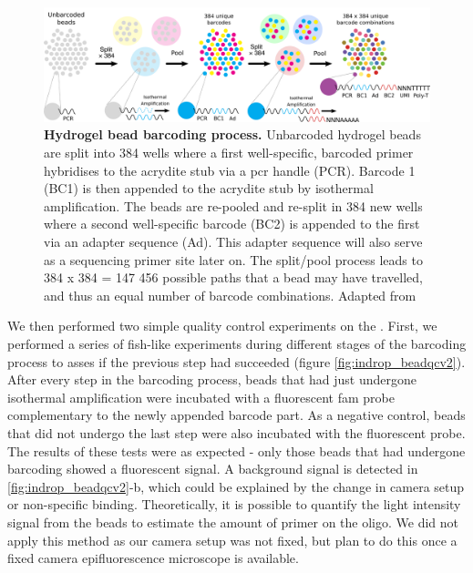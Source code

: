 \begin{figure}[ht]
\centerfloat
\includegraphics[width=\textwidth]{./ims/indrop_splitpoolv2.png}
\caption[Hydrogel bead barcoding process]{\textbf{Hydrogel bead barcoding process.} Unbarcoded hydrogel beads are split into 384 wells where a first well-specific, barcoded primer hybridises to the acrydite stub via a \acrshort{pcr} handle (PCR). Barcode 1 (BC1) is then appended to the acrydite stub by isothermal amplification. The beads are re-pooled and re-split in 384 new wells where a second well-specific barcode (BC2) is appended to the first via an adapter sequence (Ad). This adapter sequence will also serve as a sequencing primer site later on. The split/pool process leads to 384 x 384 = 147 456 possible paths that a bead may have travelled, and thus an equal number of barcode combinations. Adapted from \cite{zilionis2017}}
 \label{fig:indrop_splitpool}
\end{figure}

We then performed two simple quality control experiments on the . First, we performed a series of \acrshort{fish}-like experiments during different stages of the barcoding process to asses if the previous step had succeeded (figure \ref{fig:indrop_beadqcv2}). After every step in the barcoding process, beads that had just undergone isothermal amplification were incubated with a fluorescent \acrshort{fam} probe complementary to the newly appended barcode part. As a negative control, beads that did not undergo the last step were also incubated with the fluorescent probe. The results of these tests were as expected - only those beads that had undergone barcoding showed a fluorescent signal. A background signal is detected in \ref{fig:indrop_beadqcv2}-b, which could be explained by the change in camera setup or non-specific binding. Theoretically, it is possible to quantify the light intensity signal from the beads to estimate the amount of primer on the oligo. We did not apply this method as our camera setup was not fixed, but plan to do this once a fixed camera epifluorescence microscope is available.\pms

